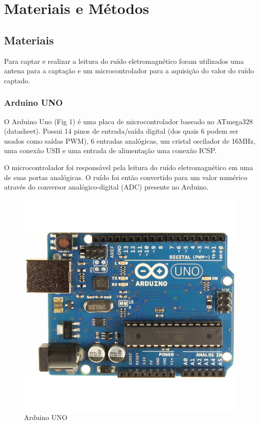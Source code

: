 \section{Materiais e Métodos}
\subsection{Materiais}
Para captar e realizar a leitura do ruído eletromagnético foram utilizados uma antena para a captação
e um microcontrolador para a aquisição do valor do ruído captado.
\subsubsection{Arduino UNO}
O Arduino Uno (Fig 1) é uma placa de microcontrolador baseado no ATmega328 (datasheet). Possui 14 pinos de entrada/saída digital (dos quais 6 podem ser usados como saídas PWM), 6 entradas analógicas, um cristal oscilador de 16MHz, uma conexão USB e uma entrada de alimentação uma conexão ICSP.

O microcontrolador foi responsável pela leitura do ruído eletromagnético em uma de suas portas analógicas. O ruído foi então convertido para um valor numérico através do conversor analógico-digital (ADC) presente no Arduino.

\begin{figure}[H]
	\label{fig1}
	\begin{centering}
		\includegraphics[width = 400pt]{img/arduino.jpg}
		\caption{Arduino UNO}
	\end{centering}	
		
\end{figure}

